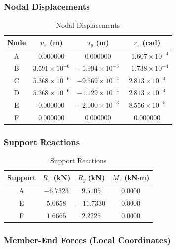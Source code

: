 \subsubsection{Nodal Displacements}

\begin{table}[H]
\centering
\caption{Nodal Displacements}
\begin{tabular}{cccc}
\toprule
Node & $u_x$ (m) & $u_y$ (m) & $r_z$ (rad) \\
\midrule
A & 0.000000 & 0.000000 & $-6.607\times10^{-4}$ \\
B & $3.591\times10^{-6}$ & $-1.994\times10^{-3}$ & $-1.738\times10^{-4}$ \\
C & $5.368\times10^{-6}$ & $-9.569\times10^{-4}$ & $2.813\times10^{-4}$ \\
D & $5.368\times10^{-6}$ & $-1.129\times10^{-4}$ & $2.813\times10^{-4}$ \\
E & 0.000000 & $-2.000\times10^{-3}$ & $8.556\times10^{-5}$ \\
F & 0.000000 & 0.000000 & 0.000000 \\
\bottomrule
\end{tabular}
\end{table}

\subsubsection{Support Reactions}

\begin{table}[H]
\centering
\caption{Support Reactions}
\begin{tabular}{cccc}
\toprule
Support & $R_x$ (kN) & $R_y$ (kN) & $M_z$ (kN$\cdot$m) \\
\midrule
A & $-6.7323$ & $9.5105$ & 0.0000 \\
E & $5.0658$ & $-11.7330$ & 0.0000 \\
F & $1.6665$ & $2.2225$ & 0.0000 \\
\bottomrule
\end{tabular}
\end{table}

\subsubsection{Member-End Forces (Local Coordinates)}

